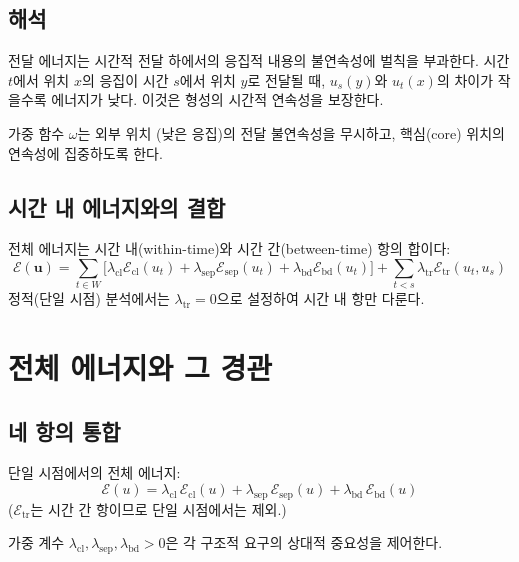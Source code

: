 \subsection{해석}

전달 에너지는 시간적 전달 하에서의 응집적 내용의 불연속성에 벌칙을 부과한다. 시간 $t$에서 위치 $x$의 응집이 시간 $s$에서 위치 $y$로 전달될 때, $u_s(y)$와 $u_t(x)$의 차이가 작을수록 에너지가 낮다. 이것은 형성의 시간적 연속성을 보장한다.

가중 함수 $\omega$는 외부 위치 (낮은 응집)의 전달 불연속성을 무시하고, 핵심(core) 위치의 연속성에 집중하도록 한다.

\subsection{시간 내 에너지와의 결합}

전체 에너지는 시간 내(within-time)와 시간 간(between-time) 항의 합이다:
\begin{equation}
    \mathcal{E}(\mathbf{u}) = \sum_{t \in W} \Big[ \lambda_{\mathrm{cl}} \mathcal{E}_{\mathrm{cl}}(u_t) + \lambda_{\mathrm{sep}} \mathcal{E}_{\mathrm{sep}}(u_t) + \lambda_{\mathrm{bd}} \mathcal{E}_{\mathrm{bd}}(u_t) \Big] + \sum_{t < s} \lambda_{\mathrm{tr}} \mathcal{E}_{\mathrm{tr}}(u_t, u_s)
\end{equation}
정적(단일 시점) 분석에서는 $\lambda_{\mathrm{tr}} = 0$으로 설정하여 시간 내 항만 다룬다.


\section{전체 에너지와 그 경관}
\label{sec:full-energy}

\subsection{네 항의 통합}

단일 시점에서의 전체 에너지:
\begin{equation}
    \boxed{\mathcal{E}(u) = \lambda_{\mathrm{cl}}\, \mathcal{E}_{\mathrm{cl}}(u) + \lambda_{\mathrm{sep}}\, \mathcal{E}_{\mathrm{sep}}(u) + \lambda_{\mathrm{bd}}\, \mathcal{E}_{\mathrm{bd}}(u)}
    \label{eq:full-energy}
\end{equation}
($\mathcal{E}_{\mathrm{tr}}$는 시간 간 항이므로 단일 시점에서는 제외.)

가중 계수 $\lambda_{\mathrm{cl}}, \lambda_{\mathrm{sep}}, \lambda_{\mathrm{bd}} > 0$은 각 구조적 요구의 상대적 중요성을 제어한다.

